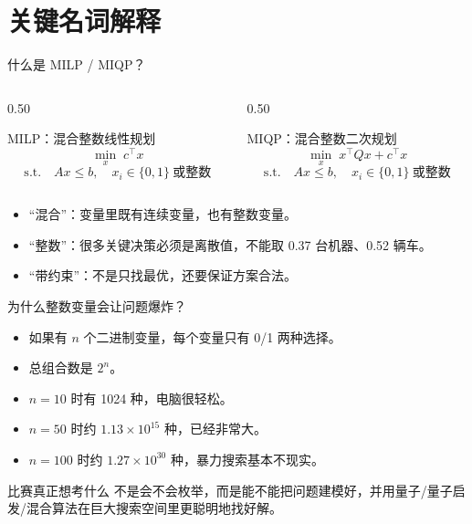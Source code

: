 \documentclass[aspectratio=169]{beamer}
\begin{document}
\section{关键名词解释}

\begin{frame}{什么是 MILP / MIQP？}
\small
\begin{columns}[T]
\begin{column}{0.50\textwidth}
\begin{block}{MILP：混合整数线性规划}
\[
  \min_x \; c^\top x
\]
\[
  \text{s.t.}\quad Ax \le b,\quad x_i \in \{0,1\}\ \text{或整数}
\]
\end{block}
\end{column}
\begin{column}{0.50\textwidth}
\begin{block}{MIQP：混合整数二次规划}
\[
  \min_x \; x^\top Qx + c^\top x
\]
\[
  \text{s.t.}\quad Ax \le b,\quad x_i \in \{0,1\}\ \text{或整数}
\]
\end{block}
\end{column}
\end{columns}

\vspace{0.6em}
\begin{itemize}
  \item ``混合''：变量里既有连续变量，也有整数变量。
  \item ``整数''：很多关键决策必须是离散值，不能取 0.37 台机器、0.52 辆车。
  \item ``带约束''：不是只找最优，还要保证方案合法。
\end{itemize}
\end{frame}

\begin{frame}{为什么整数变量会让问题爆炸？}
\small
\begin{itemize}
  \item 如果有 $n$ 个二进制变量，每个变量只有 0/1 两种选择。
  \item 总组合数是 $2^n$。
  \item $n=10$ 时有 1024 种，电脑很轻松。
  \item $n=50$ 时约 $1.13\times 10^{15}$ 种，已经非常大。
  \item $n=100$ 时约 $1.27\times 10^{30}$ 种，暴力搜索基本不现实。
\end{itemize}

\begin{block}{比赛真正想考什么}
  不是会不会枚举，而是能不能把问题建模好，并用量子/量子启发/混合算法在巨大搜索空间里更聪明地找好解。
\end{block}
\end{frame}
\end{document}
